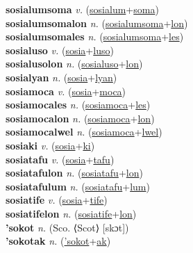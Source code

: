 \textbf{sosialumsoma} \textit{v.} (\hyperref[sosialum]{sosialum}+\hyperref[soma]{soma})
 \label{sosialumsoma} \\
\textbf{sosialumsomalon} \textit{n.} (\hyperref[sosialumsoma]{sosialumsoma}+\hyperref[lon]{lon})
 \label{sosialumsomalon} \\
\textbf{sosialumsomales} \textit{n.} (\hyperref[sosialumsoma]{sosialumsoma}+\hyperref[les]{les})
 \label{sosialumsomales} \\
\textbf{sosialuso} \textit{v.} (\hyperref[sosia]{sosia}+\hyperref[luso]{luso})
 \label{sosialuso} \\
\textbf{sosialusolon} \textit{n.} (\hyperref[sosialuso]{sosialuso}+\hyperref[lon]{lon})
 \label{sosialusolon} \\
\textbf{sosialyan} \textit{n.} (\hyperref[sosia]{sosia}+\hyperref[lyan]{lyan})
 \label{sosialyan} \\
\textbf{sosiamoca} \textit{v.} (\hyperref[sosia]{sosia}+\hyperref[moca]{moca})
 \label{sosiamoca} \\
\textbf{sosiamocales} \textit{n.} (\hyperref[sosiamoca]{sosiamoca}+\hyperref[les]{les})
 \label{sosiamocales} \\
\textbf{sosiamocalon} \textit{n.} (\hyperref[sosiamoca]{sosiamoca}+\hyperref[lon]{lon})
 \label{sosiamocalon} \\
\textbf{sosiamocalwel} \textit{n.} (\hyperref[sosiamoca]{sosiamoca}+\hyperref[lwel]{lwel})
 \label{sosiamocalwel} \\
\textbf{sosiaki} \textit{v.} (\hyperref[sosia]{sosia}+\hyperref[ki]{ki})
 \label{sosiaki} \\
\textbf{sosiatafu} \textit{v.} (\hyperref[sosia]{sosia}+\hyperref[tafu]{tafu})
 \label{sosiatafu} \\
\textbf{sosiatafulon} \textit{n.} (\hyperref[sosiatafu]{sosiatafu}+\hyperref[lon]{lon})
 \label{sosiatafulon} \\
\textbf{sosiatafulum} \textit{n.} (\hyperref[sosiatafu]{sosiatafu}+\hyperref[lum]{lum})
 \label{sosiatafulum} \\
\textbf{sosiatife} \textit{v.} (\hyperref[sosia]{sosia}+\hyperref[tife]{tife})
 \label{sosiatife} \\
\textbf{sosiatifelon} \textit{n.} (\hyperref[sosiatife]{sosiatife}+\hyperref[lon]{lon})
 \label{sosiatifelon} \\
\textbf{'sokot} \textit{n.} (Sco. ⟨Scot⟩ [skɔt])
 \label{'sokot} \\
\textbf{'sokotak} \textit{n.} (\hyperref['sokot]{'sokot}+\hyperref[ak]{ak})
 \label{'sokotak} \\
